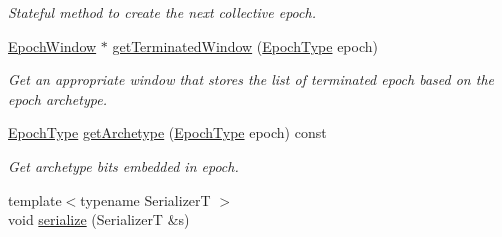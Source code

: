 \begin{DoxyCompactItemize}
\begin{DoxyCompactList}\small\item\em Stateful method to create the next collective epoch. \end{DoxyCompactList}\item 
\hyperlink{structvt_1_1epoch_1_1_epoch_window}{Epoch\+Window} $\ast$ \hyperlink{structvt_1_1epoch_1_1_epoch_manip_a2ed00df099793bd9f9452203ba8ba571}{get\+Terminated\+Window} (\hyperlink{namespacevt_a985a5adf291c34a3ca263b3378388236}{Epoch\+Type} epoch)
\begin{DoxyCompactList}\small\item\em Get an appropriate window that stores the list of terminated epoch based on the epoch archetype. \end{DoxyCompactList}\item 
\hyperlink{namespacevt_a985a5adf291c34a3ca263b3378388236}{Epoch\+Type} \hyperlink{structvt_1_1epoch_1_1_epoch_manip_ac1f50556319696bba8695a013f49abcf}{get\+Archetype} (\hyperlink{namespacevt_a985a5adf291c34a3ca263b3378388236}{Epoch\+Type} epoch) const
\begin{DoxyCompactList}\small\item\em Get archetype bits embedded in epoch. \end{DoxyCompactList}\item 
{\footnotesize template$<$typename SerializerT $>$ }\\void \hyperlink{structvt_1_1epoch_1_1_epoch_manip_a5a502343c972a5efc975943ce8510d1d}{serialize} (SerializerT \&s)
\end{DoxyCompactItemize}
